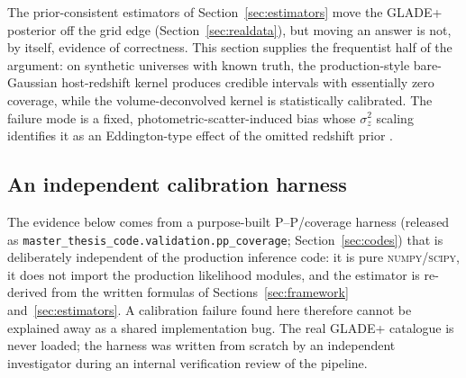The prior-consistent estimators of Section~\ref{sec:estimators} move the GLADE+ posterior off the grid edge (Section~\ref{sec:realdata}), but moving an answer is not, by itself, evidence of correctness. This section supplies the frequentist half of the argument: on synthetic universes with known truth, the production-style bare-Gaussian host-redshift kernel produces credible intervals with essentially zero coverage, while the volume-deconvolved kernel is statistically calibrated. The failure mode is a fixed, photometric-scatter-induced bias whose $\sigma_z^2$ scaling identifies it as an Eddington-type effect of the omitted redshift prior
\citep{Eddington1913}.

\subsection{An independent calibration harness}
\label{sec:coverage:harness}

The evidence below comes from a purpose-built \mbox{P--P}/coverage harness (released as \texttt{master\_thesis\_code.validation.pp\_coverage}; Section~\ref{sec:codes}) that is deliberately independent of the production inference code: it is pure \textsc{numpy}/\textsc{scipy}, it does not import the production likelihood modules, and the estimator is re-derived from the written formulas of Sections~\ref{sec:framework} and~\ref{sec:estimators}. A calibration failure found here therefore cannot be explained away as a shared implementation bug. The real GLADE+ catalogue is never loaded; the harness was written from scratch by an independent investigator during an internal verification review of the pipeline.

